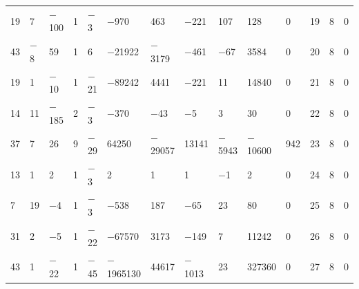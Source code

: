 \documentclass[10pt,a4paper]{amsart}
\numberwithin{equation}{section}
\theoremstyle{definition}
\numberwithin{table}{section}
\begin{document}
{\begin{paracol}{3}
\begin{supertabular}{|w{c}{.32cm}w{c}{.32cm}w{c}{.32cm}@{\hspace{.5cm}}w{c}{.2cm}w{c}{.2cm}|@{\hspace{\tabcolsep}}HHHHHHw{c}{.17cm}w{c}{.17cm}w{c}{.17cm}|}
			19 & 7 & $-$100 & 1 & $-$3 & $-$970 & 463 & $-$221 & 107 & 128 & 0 & 19 & 8 & 0 \\
			43 & $-$8 & 59 & 1 & 6 & $-$21922 & $-$3179 & $-$461 & $-$67 & 3584 & 0 & 20 & 8 & 0 \\
			19 & 1 & $-$10 & 1 & $-$21 & $-$89242 & 4441 & $-$221 & 11 & 14840 & 0 & 21 & 8 & 0 \\
			14 & 11 & $-$185 & 2 & $-$3 & $-$370 & $-$43 & $-$5 & 3 & 30 & 0 & 22 & 8 & 0 \\
			37 & 7 & 26 & 9 & $-$29 & 64250 & $-$29057 & 13141 & $-$5943 & $-$10600 & 942 & 23 & 8 & 0 \\
			13 & 1 & 2 & 1 & $-$3 & 2 & 1 & 1 & $-$1 & 2 & 0 & 24 & 8 & 0 \\
			7 & 19 & $-$4 & 1 & $-$3 & $-$538 & 187 & $-$65 & 23 & 80 & 0 & 25 & 8 & 0 \\
			31 & 2 & $-$5 & 1 & $-$22 & $-$67570 & 3173 & $-$149 & 7 & 11242 & 0 & 26 & 8 & 0 \\
			43 & 1 & $-$22 & 1 & $-$45 & $-$1965130 & 44617 & $-$1013 & 23 & 327360 & 0 & 27 & 8 & 0 \\ \hline
		\end{supertabular}
		
		\switchcolumn
		

\end{paracol}}
\end{document}
